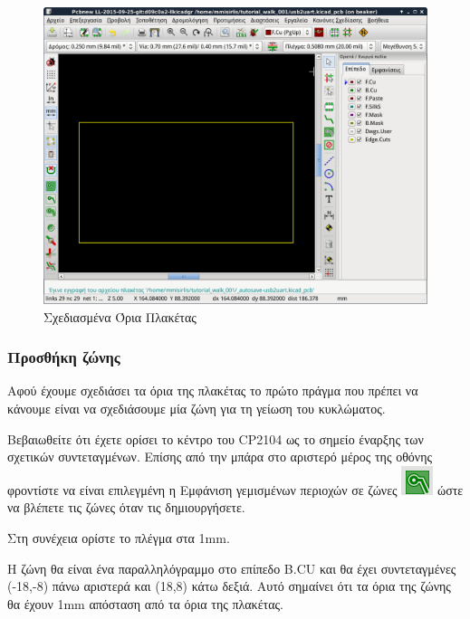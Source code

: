 \documentclass[a4paper]{article}
\begin{document}
\begin{figure}
  \begin{center}
    \includegraphics[width=.9\textwidth]{img/pcb-main-edges.png}
    \caption{Σχεδιασμένα Όρια Πλακέτας}
    \label{fig:pcb-main-edges}
  \end{center}
\end{figure}


\subsubsection{Προσθήκη ζώνης}
Αφού έχουμε σχεδιάσει τα όρια της πλακέτας το πρώτο πράγμα που πρέπει να κάνουμε είναι να σχεδιάσουμε μία ζώνη για τη γείωση του κυκλώματος. 

Βεβαιωθείτε ότι έχετε ορίσει το κέντρο του CP2104  ως το σημείο έναρξης των σχετικών συντεταγμένων. Επίσης από την μπάρα στο αριστερό μέρος της οθόνης φροντίστε να είναι επιλεγμένη η Εμφάνιση γεμισμένων περιοχών σε ζώνες \includegraphics[scale=.5]{img/pcb-ico-fullzones.png} ώστε να βλέπετε τις ζώνες όταν τις δημιουργήσετε.

Στη συνέχεια ορίστε το πλέγμα στα 1mm.

Η ζώνη θα είναι ένα παραλληλόγραμμο στο επίπεδο B.CU και θα έχει συντεταγμένες (-18,-8) πάνω αριστερά και (18,8) κάτω δεξιά. Αυτό σημαίνει ότι τα όρια της ζώνης θα έχουν 1mm απόσταση από τα όρια της πλακέτας.
\end{document}
